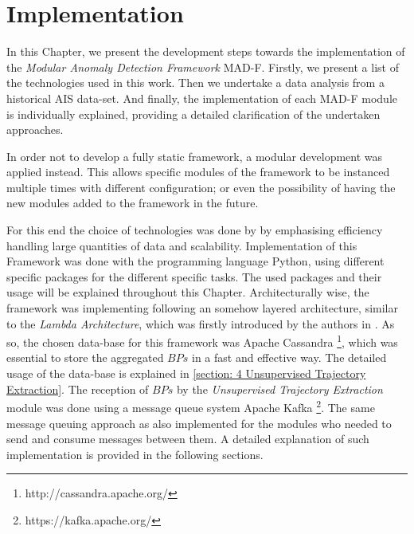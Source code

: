 \chapter{Implementation}
\label{chapter:Chapter 4}

In this Chapter, we present the development steps towards the implementation of the \emph{Modular Anomaly Detection Framework} MAD-F. Firstly, we present a list of the technologies used in this work. Then we undertake a data analysis from a historical AIS data-set. And finally, the implementation of each MAD-F module is individually  explained, providing a detailed clarification of the undertaken approaches.


In order not to develop a fully static framework, a modular development was applied instead. This allows specific modules of the framework to be instanced multiple times with different configuration; or even the possibility of having the new modules added to the framework in the future.

For this end the choice of technologies was done by by emphasising efficiency handling large quantities of data and scalability. Implementation of this Framework was done with the programming language Python, using different specific packages for the different specific tasks. The used packages and their usage will be explained throughout this Chapter. Architecturally wise, the framework was implementing following an somehow layered architecture, similar to the \emph{Lambda Architecture}, which was firstly introduced by the authors in \cite{Marz2015BigSystems}. As so, the chosen data-base for this framework was Apache Cassandra \footnote{http://cassandra.apache.org/}, which was essential to store the aggregated $BPs$ in a fast and effective way. The detailed usage of the data-base is explained in \ref{section: 4 Unsupervised Trajectory Extraction}. The reception of $BPs$ by the \emph{Unsupervised Trajectory Extraction} module was done using a message queue system Apache Kafka \footnote{https://kafka.apache.org/}. The same message queuing approach as also implemented for the modules who needed to send and consume messages between them. A detailed explanation of such implementation is provided in the following sections.

